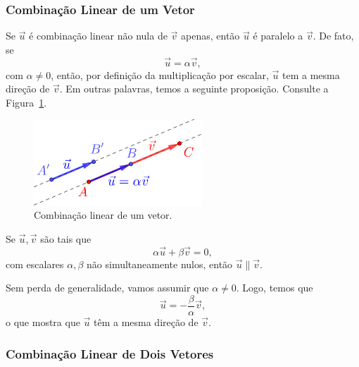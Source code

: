 \subsubsection{Combinação Linear de um Vetor}

Se $\vec{u}$ é combinação linear não nula de $\vec{v}$ apenas, então $\vec{u}$ é paralelo a $\vec{v}$. De fato, se
\begin{equation}
  \vec{u} = \alpha\vec{v},
\end{equation}
com $\alpha\neq 0$, então, por definição da multiplicação por escalar, $\vec{u}$ tem a mesma direção de $\vec{v}$. Em outras palavras, temos a seguinte proposição. Consulte a Figura~\ref{cap_base_sec_comblin:fig:comb2vet}.

\begin{figure}[h]
  \centering
  \includegraphics[width=2.5in]{./cap_base/dados/fig_comb2vet/fig.jpg}
  \caption{Combinação linear de um vetor.}
  \label{cap_base_sec_comblin:fig:comb2vet}
\end{figure}

\begin{proposicao}\label{cap_base_sec_comblin:prop:comb2vet}
  Se $\vec{u},\vec{v}$ são tais que
  \begin{equation}
    \alpha\vec{u} + \beta\vec{v} = 0,
  \end{equation}
  com escalares $\alpha,\beta$ não simultaneamente nulos, então $\vec{u}\parallel \vec{v}$.
\end{proposicao}
\begin{demonstracao}
  Sem perda de generalidade, vamos assumir que $\alpha\neq 0$. Logo, temos que
  \begin{equation}
    \vec{u} = -\frac{\beta}{\alpha}\vec{v},
  \end{equation}
  o que mostra que $\vec{u}$ têm a mesma direção de $\vec{v}$.
\end{demonstracao}

\subsubsection{Combinação Linear de Dois Vetores}

